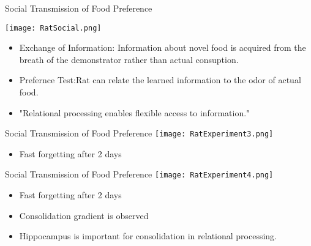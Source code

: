 \documentclass{beamer}
\begin{document}
\begin{frame}{Social Transmission of Food Preference}
\begin{minipage}{0.3\linewidth}
		\centering
			\texttt{[image: RatSocial.png]}
\end{minipage}
\hfill
\begin{minipage}{0.65\linewidth}
		\begin{itemize}
		\item
		\alert{Exchange of Information:} Information about novel food is acquired
		from the breath of the demonstrator rather than actual consuption. 
		\item
		\alert{Prefernce Test:}Rat can relate the learned information to the
		odor of actual food.
		\end{itemize}
\end{minipage}

\begin{minipage}{\linewidth}
\vspace{1cm}
\begin{itemize}
		\item
"Relational processing enables flexible access to information."
\end{itemize}
\end{minipage}

\end{frame}


\begin{frame}{Social Transmission of Food Preference}
			\texttt{[image: RatExperiment3.png]}
		\begin{itemize}
		\item
				Fast forgetting after 2 days
			
		\end{itemize}
\end{frame}

\begin{frame}{Social Transmission of Food Preference}
			\texttt{[image: RatExperiment4.png]}
		\begin{itemize}
		\item
				Fast forgetting after 2 days
		\item
				Consolidation gradient is observed
		\item
				Hippocampus is important for consolidation in relational processing.
			
		\end{itemize}
\end{frame}
\end{document}
